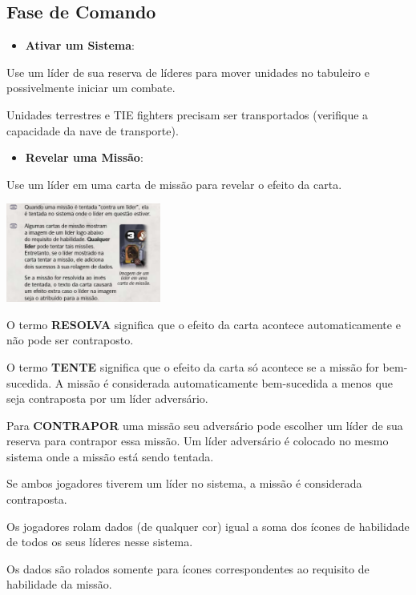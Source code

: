 \documentclass[11pt]{article}
\begin{document}
\subsection{Fase de Comando}
\label{sec:orgb0a1e2b}

\begin{itemize}
\item \textbf{Ativar um Sistema}:
\end{itemize}

Use um líder de sua reserva de líderes para mover unidades no tabuleiro e possivelmente iniciar um combate.

Unidades terrestres e TIE fighters precisam ser transportados (verifique a capacidade da nave de transporte).

\begin{itemize}
\item \textbf{Revelar uma Missão}:
\end{itemize}

Use um líder em uma carta de missão para revelar o efeito da carta.

\begin{center}
\includegraphics[width=2.0in]{./lider-effect.png}
\end{center}

O termo \textbf{RESOLVA} significa que o efeito da carta acontece automaticamente e não pode ser contraposto.

O termo \textbf{TENTE} significa que o efeito da carta só acontece se a missão for bem-sucedida. A missão é considerada automaticamente bem-sucedida a menos que seja contraposta por um líder adversário.

Para \textbf{CONTRAPOR} uma missão seu adversário pode escolher um líder de sua reserva para contrapor essa missão. Um líder adversário é colocado no mesmo sistema onde a missão está sendo tentada.

Se ambos jogadores tiverem um líder no sistema, a missão é considerada contraposta.

Os jogadores rolam dados (de qualquer cor) igual a soma dos ícones de habilidade de todos os seus líderes nesse sistema.

Os dados são rolados somente para ícones correspondentes ao requisito de habilidade da missão.
\end{document}
